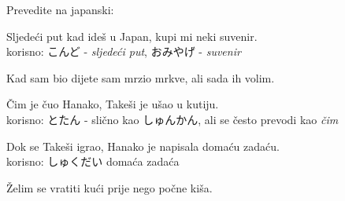	\begin{mondai}{Prevedite na japanski:}
		\item Sljedeći put kad ideš u Japan, kupi mi neki suvenir.\\korisno: こんど - \textit{sljedeći put}, おみやげ - \textit{suvenir}
		\item Kad sam bio dijete sam mrzio mrkve, ali sada ih volim.
		\item Čim je čuo Hanako, Takeši je ušao u kutiju.\\korisno: とたん - slično kao しゅんかん, ali se često prevodi kao \textit{čim}
		\item Dok se Takeši igrao, Hanako je napisala domaću zadaću.\\korisno: しゅくだい domaća zadaća
		\item Želim se vratiti kući prije nego počne kiša.
	\end{mondai}

